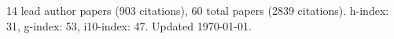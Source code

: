 14 lead author papers (903 citations),
60 total papers (2839 citations).\newline
h-index: 31, g-index: 53, i10-index: 47. Updated \today.